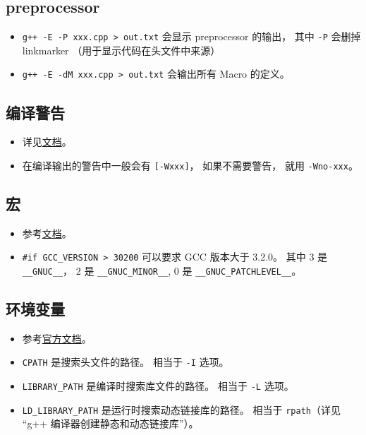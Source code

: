 \subsection{preprocessor}
\begin{itemize}
\item \verb|g++ -E -P xxx.cpp > out.txt| 会显示 preprocessor 的输出， 其中 \verb|-P| 会删掉 linkmarker （用于显示代码在头文件中来源）
\item \verb|g++ -E -dM xxx.cpp > out.txt| 会输出所有 Macro 的定义。
\end{itemize}

\subsection{编译警告}
\begin{itemize}
\item 详见\href{https://gcc.gnu.org/onlinedocs/gcc/Warning-Options.html}{文档}。
\item 在编译输出的警告中一般会有 \verb|[-Wxxx]|， 如果不需要警告， 就用 \verb|-Wno-xxx|。
\end{itemize}

\subsection{宏}
\begin{itemize}
\item 参考\href{https://gcc.gnu.org/onlinedocs/cpp/Common-Predefined-Macros.html}{文档}。
\item \verb|#if GCC_VERSION > 30200| 可以要求 GCC 版本大于 3.2.0。 其中 3 是 \verb|__GNUC__|， 2 是 \verb|__GNUC_MINOR__|,  0 是 \verb|__GNUC_PATCHLEVEL__|。
\end{itemize}

\subsection{环境变量}
\begin{itemize}
\item 参考\href{https://gcc.gnu.org/onlinedocs/gcc/Environment-Variables.html}{官方文档}。
\item \verb|CPATH| 是搜索头文件的路径。 相当于 \verb|-I| 选项。
\item \verb|LIBRARY_PATH| 是编译时搜索库文件的路径。 相当于 \verb|-L| 选项。
\item \verb|LD_LIBRARY_PATH| 是运行时搜索动态链接库的路径。 相当于 \verb|rpath|（详见 “g++ 编译器创建静态和动态链接库”）。
\end{itemize}

